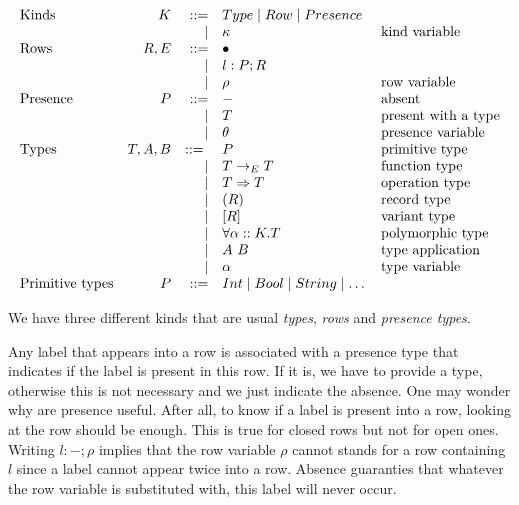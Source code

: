 \documentclass[10pt, nonacm=true, language=french, language=english]{acmart}
\begin{document}
\[
  \begin{array}{lrrll}
    \text{Kinds}           & K & ::= & Type \mid Row \mid Presence & \\
                           &&\mid & \kappa & \text{kind variable} \\

    \text{Rows}            & R, E & ::= & \bullet & \\
                           &&\mid & l:P;R & \\
                           &&\mid & \rho & \text{row variable} \\

    \text{Presence}        & P & ::= & - & \text{absent} \\
                           &&\mid & T & \text{present with a type} \\
                           &&\mid & \theta & \text{presence variable} \\

    \text{Types}           & T, A, B & ::=\ & P & \text{primitive type} \\
                           &&\mid & T \to_{E} T & \text{function type} \\
                           &&\mid & T \Rightarrow T & \text{operation type} \\
                           &&\mid & (R) & \text{record type} \\
                           &&\mid & [R] & \text{variant type} \\
                           &&\mid & \forall \alpha :: K. T & \text{polymorphic type} \\
                           &&\mid & A\ B & \text{type application} \\
                           &&\mid & \alpha & \text{type variable} \\

    \text{Primitive types} & P & ::= & Int \mid Bool \mid String \mid \dots &
  \end{array}
\]

We have three different kinds that are usual \emph{types}, \emph{rows} and \emph{presence types}.

Any label that appears into a row is associated with a presence type that indicates if the label is present in this row. If it is, we have to provide a type, otherwise this is not necessary and we just indicate the absence. One may wonder why are presence useful. After all, to know if a label is present into a row, looking at the row should be enough. This is true for closed rows but not for open ones. Writing $l:-;\rho$ implies that the row variable $\rho$ cannot stands for a row containing $l$ since a label cannot appear twice into a row. Absence guaranties that whatever the row variable is substituted with, this label will never occur.
\end{document}
